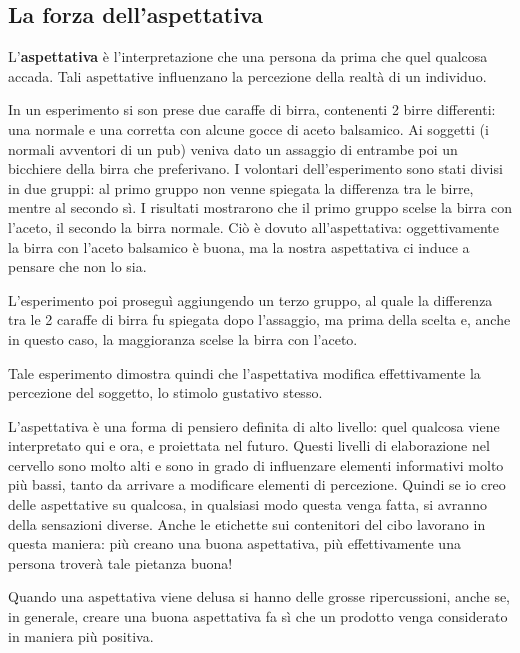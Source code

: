 \subsection{La forza dell'aspettativa}

\begin{definition}[Aspettativa]
L'\textbf{aspettativa} è l'interpretazione che una persona da prima che quel 
qualcosa accada. Tali aspettative influenzano la percezione della realtà di un 
individuo. 
\end{definition}

\begin{example}
In un esperimento si son prese due caraffe di birra, contenenti 2 birre
differenti: una normale e una corretta con alcune gocce di aceto balsamico.
Ai soggetti (i normali avventori di un pub) veniva dato un assaggio di entrambe
poi un bicchiere della birra che preferivano.
I volontari dell'esperimento sono stati divisi in due gruppi: al primo gruppo
non venne spiegata la differenza tra le birre, mentre al secondo sì. I
risultati mostrarono che il primo gruppo scelse la birra con l'aceto, il
secondo la birra normale. Ciò è dovuto all'aspettativa: oggettivamente la birra
con l'aceto balsamico è buona, ma la nostra aspettativa ci induce a pensare che
non lo sia.

L'esperimento poi proseguì aggiungendo un terzo gruppo, al quale la
differenza tra le 2 caraffe di birra fu spiegata dopo l'assaggio, ma
prima della scelta e, anche in questo caso, la maggioranza scelse la birra
con l'aceto.

Tale esperimento dimostra quindi che l'aspettativa modifica
effettivamente la percezione del soggetto, lo stimolo gustativo stesso. 
\end{example}

L'aspettativa è una forma di pensiero definita di alto livello: quel qualcosa
viene interpretato qui e ora, e proiettata nel futuro. Questi livelli di
elaborazione nel cervello sono molto alti e sono in grado di influenzare
elementi informativi molto più bassi, tanto da arrivare a modificare elementi 
di percezione. Quindi se io creo delle aspettative su qualcosa, in qualsiasi 
modo questa venga fatta, si avranno della sensazioni diverse. Anche le 
etichette sui contenitori del cibo lavorano in questa maniera: più creano una 
buona aspettativa, più effettivamente una persona troverà tale pietanza buona!

Quando una aspettativa viene delusa si hanno delle grosse ripercussioni, anche
se, in generale, creare una buona aspettativa fa sì che un prodotto venga
considerato in maniera più positiva.

